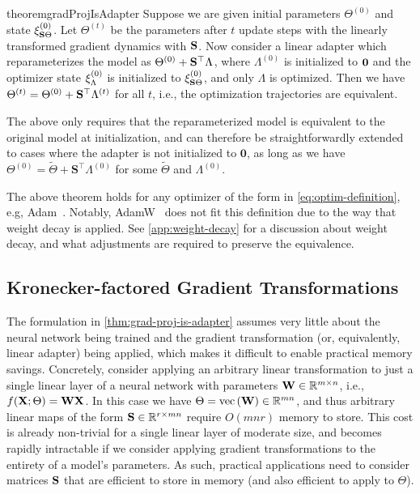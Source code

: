 \begin{restatable}{theorem}{gradProjIsAdapter}
 Suppose we are given initial parameters $\Theta^{(0)}$ and state $\xi^{(0)}_{{\mathbf{S}}\Theta}$.
Let $\Theta^{(t)}$ be the parameters  after $t$ update steps with the linearly transformed gradient dynamics with ${\mathbf{S}}$. 
Now consider a linear adapter which reparameterizes the model as $\Theta^{(0)} + {\mathbf{S}}^\top \Lambda^{}$, where $\Lambda^{(0)}$ is initialized to ${\mathbf{0}}$ and the optimizer state $\xi_{\Lambda}^{(0)}$ is initialized to $\xi_{{\mathbf{S}}\Theta}^{(0)}$, and only $\Lambda$ is optimized.
Then we have $\Theta^{(t)} = \Theta^{(0)} + {\mathbf{S}}^{\top}\Lambda^{(t)}$ for all $t$, i.e., the optimization trajectories are equivalent.
\label{thm:grad-proj-is-adapter}
\end{restatable}

\begin{remark}
The above only requires that the reparameterized model is equivalent to the original model at initialization, and can therefore be straightforwardly extended to cases where the adapter is not initialized to $\mathbf{0}$, as long as we have $\Theta^{(0)} = \tilde{\Theta} + \mathbf{S}^\top  \Lambda^{(0)}$ for some $\tilde{\Theta}$ and $\Lambda^{(0)}$.
\end{remark}

\begin{remark}
The above theorem holds for any optimizer of the form in \cref{eq:optim-definition}, e.g, Adam~\citep{adam}.
Notably, AdamW~\citep{adamw} does not fit this definition due to the way that weight decay is applied.
See \cref{app:weight-decay} for a discussion about weight decay, and what adjustments are required to preserve the equivalence. 
\end{remark}
\vcram{-2mm}
\subsection{Kronecker-factored Gradient Transformations}
\label{sec:special-cases}
\vcram{-1mm}
The formulation in \cref{thm:grad-proj-is-adapter} assumes very little about the neural network being trained and the gradient transformation (or, equivalently, linear adapter) being applied, which makes it difficult to enable practical memory savings. Concretely, consider applying an arbitrary linear transformation to just a single linear layer of a neural network with parameters ${\mathbf{W}} \in \mathbb{R}^{m \times n}$, i.e., $f({\mathbf{X}} ; \Theta) = {\mathbf{W}} {\mathbf{X}}$. In this case we have $\Theta = \operatorname{vec}\left({\mathbf{W}}\right) \in \mathbb{R}^{mn}$, and thus arbitrary linear maps of the form ${\mathbf{S}} \in \mathbb{R}^{r \times mn}$ require $O(mnr)$ memory to store.
This cost is already non-trivial for a single linear layer of moderate size, and becomes rapidly intractable if we consider applying gradient transformations to the entirety of a model's parameters.
As such, practical applications need to consider matrices ${\mathbf{S}}$ that are efficient to store in memory (and also efficient to apply to $\Theta$). 

